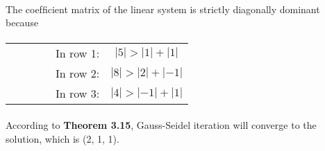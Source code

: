 \documentclass{article}  %
\begin{document}
        \paragraph{}The coefﬁcient matrix of the linear system is strictly diagonally dominant because
        \paragraph{}
        \renewcommand\tabcolsep{12.0pt} %
        \begin{threeparttable} %
            \begin{tabular}{cccccc} 
             & & & & In row 1: & $|5| > |1| + |1|$ \\
             & & & & In row 2: & $|8| > |2| + |-1|$ \\
             & & & & In row 3: & $|4| > |-1| + |1|$ 
            \end{tabular} 
        \end{threeparttable}
        \paragraph{}According to \textbf{Theorem 3.15}, Gauss-Seidel iteration will converge to the solution, which is (2, 1, 1).
\end{document}
